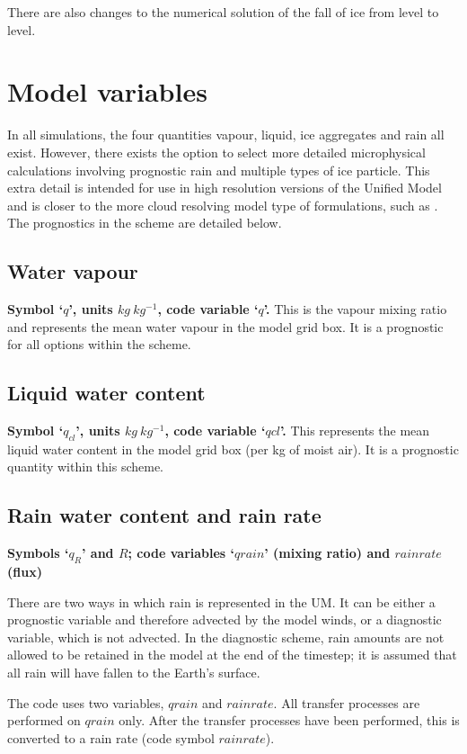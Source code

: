 \documentclass{UMDP_article}
\begin{document}
There are also changes to the numerical solution of the fall of ice from level 
to level.

\newpage

\section{Model variables}

In all simulations, the four quantities vapour, liquid, ice aggregates and
rain all exist. However, there exists the option to select more detailed 
microphysical calculations involving prognostic rain and multiple types of 
ice particle. This extra detail is intended for use in high resolution 
versions of the Unified Model and is closer to the more cloud resolving 
model type of formulations, such as \cite{Swann:1996}. The prognostics in 
the scheme are detailed below. 

\subsection{Water vapour}
\label{sec:wvdes}
\textbf{Symbol `$q$', units $kg~kg^{-1}$, code variable `$q$'.}
This is the vapour mixing ratio and represents the mean
water vapour in the model grid box. It is a prognostic for all options 
within the scheme.

\subsection{Liquid water content}
\textbf{Symbol `$q_{cl}$', units $kg~kg^{-1}$, code variable `$qcl$'.}
This represents the mean liquid water content
in the model grid box (per kg of moist air). It is a prognostic quantity 
within this scheme.

\subsection{Rain water content and rain rate}
\textbf{Symbols `$q_R$' and $R$; code variables `$qrain$' (mixing ratio) and $rainrate$ (flux) }

There are two ways in which rain is represented in the UM. It can be either
a prognostic variable and therefore advected by the model winds, or a 
diagnostic variable, which is not advected. In the diagnostic scheme, rain amounts
are not allowed to be retained in the model at the end of the timestep; it is
assumed that all rain will have fallen to the Earth's surface. 

The code uses two variables, $qrain$ and $rainrate$. All transfer processes
are performed on $qrain$ only. After the transfer processes have been performed,
this is converted to a rain rate (code symbol $rainrate$). 
\end{document}
